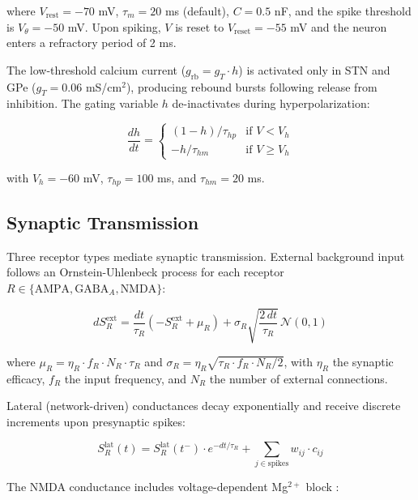 \documentclass[11pt,a4paper]{article}
\begin{document}
where $V_{\text{rest}} = -70$ mV, $\tau_m = 20$ ms (default), $C = 0.5$ nF, and the spike threshold is $V_{\theta} = -50$ mV. Upon spiking, $V$ is reset to $V_{\text{reset}} = -55$ mV and the neuron enters a refractory period of 2 ms.

The low-threshold calcium current ($g_{\text{rb}} = g_T \cdot h$) is activated only in STN and GPe ($g_T = 0.06$ mS/cm$^2$), producing rebound bursts following release from inhibition. The gating variable $h$ de-inactivates during hyperpolarization:

\begin{equation}
\frac{dh}{dt} = \begin{cases} (1-h)/\tau_{hp} & \text{if } V < V_h \\ -h/\tau_{hm} & \text{if } V \geq V_h \end{cases}
\end{equation}

with $V_h = -60$ mV, $\tau_{hp} = 100$ ms, and $\tau_{hm} = 20$ ms.

\subsection{Synaptic Transmission}

Three receptor types mediate synaptic transmission. External background input follows an Ornstein-Uhlenbeck process for each receptor $R \in \{\text{AMPA}, \text{GABA}_A, \text{NMDA}\}$:

\begin{equation}
dS^{\text{ext}}_R = \frac{dt}{\tau_R}(-S^{\text{ext}}_R + \mu_R) + \sigma_R \sqrt{\frac{2 \, dt}{\tau_R}} \, \mathcal{N}(0,1)
\end{equation}

where $\mu_R = \eta_R \cdot f_R \cdot N_R \cdot \tau_R$ and $\sigma_R = \eta_R \sqrt{\tau_R \cdot f_R \cdot N_R / 2}$, with $\eta_R$ the synaptic efficacy, $f_R$ the input frequency, and $N_R$ the number of external connections.

Lateral (network-driven) conductances decay exponentially and receive discrete increments upon presynaptic spikes:

\begin{equation}
S^{\text{lat}}_R(t) = S^{\text{lat}}_R(t^-) \cdot e^{-dt/\tau_R} + \sum_{j \in \text{spikes}} w_{ij} \cdot c_{ij}
\end{equation}

The NMDA conductance includes voltage-dependent Mg$^{2+}$ block \citep{jahr1990}:
\end{document}
